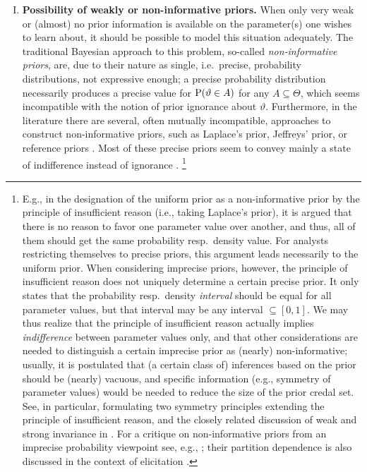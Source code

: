 \begin{enumerate}[I.]
\item \textbf{Possibility of weakly or non-informative priors.}\label{enum:noninformative}
When only very weak or (almost) no prior information is available on the parameter(s) one wishes to learn about,
it should be possible to model this situation adequately.
The traditional Bayesian approach to this problem, so-called \emph{non-informative priors},
are, due to their nature as single, i.e.\ precise, probability distributions, not expressive enough;
a precise probability distribution necessarily produces a precise value for $\operatorname{P}(\vartheta \in A)$ for any $A \subseteq \Theta$,
which seems incompatible with the notion of prior ignorance about $\vartheta$.
Furthermore, in the literature there are several, often mutually incompatible, approaches to construct non-informative priors,
such as Laplace's prior, Jeffreys' prior, or reference priors \parencite[see, e.g.,][\S 5.6.2]{2000:bernardosmith}.
Most of these precise priors seem to convey mainly a state of indifference instead of ignorance \parencite[p.~271]{1999:rueger}.%
\footnote{\label{footnote:symm}
E.g., in the designation of the uniform prior as a non-informative prior by the principle of insufficient reason
(i.e., taking Laplace's prior),
it is argued that there is no reason to favor one parameter value over another,
and thus, all of them should get the same probability resp.\ density value.
For analysts restricting themselves to precise priors, this argument leads necessarily to the uniform prior.
When considering imprecise priors, however, the principle of insufficient reason does not uniquely determine a certain precise prior.
It only states that the probability resp.\ density \emph{interval} should be equal for all parameter values,
but that interval may be any interval $\subseteq [0,1]$.
We may thus realize that the principle of insufficient reason actually implies \emph{indifference} between parameter values only,
and that other considerations are needed to distinguish a certain imprecise prior as (nearly) non-informative;
usually, it is postulated that (a certain class of) inferences based on the prior should be (nearly) vacuous,
and specific information (e.g., symmetry of parameter values) would be needed to reduce the size of the prior credal set.
See, in particular, \textcite[\S 4.3]{2001:weichselberger} formulating two symmetry principles
extending the principle of insufficient reason,
and the closely related discussion of weak and strong invariance in \textcite[\S 3]{itip-structural}.
For a critique on non-informative priors from an imprecise probability viewpoint see, e.g., \textcite[\S 5.5]{1991:walley};
their partition dependence is also discussed in the context of elicitation \parencite[see][\S 3]{itip-elicitation}.}
\end{enumerate}

